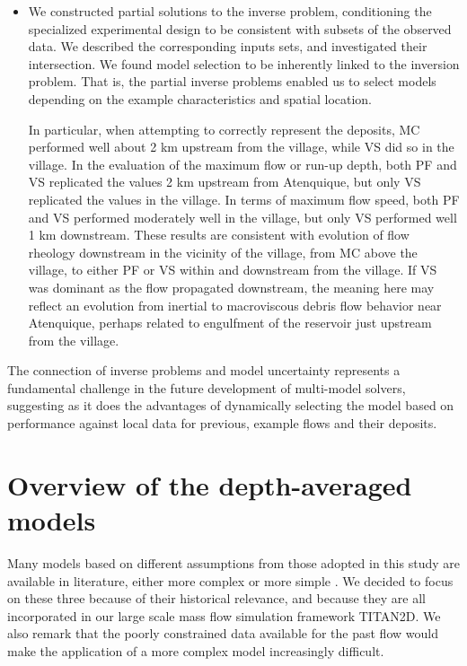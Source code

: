 \documentclass[nhess, manuscript]{copernicus}
\begin{document}
\begin{itemize}
  \item We constructed partial solutions to the inverse problem, conditioning the specialized experimental design to be consistent with subsets of the observed data. We  described the corresponding inputs sets, and investigated their intersection. We found model selection to be inherently linked to the inversion problem. That is, the partial inverse problems enabled us to select models depending on the example characteristics and spatial location.

      In particular, when attempting to correctly represent the deposits, MC performed well about 2 km upstream from the village, while VS did so in the village. In the evaluation of the maximum flow or run-up depth, both PF and VS replicated the values 2 km upstream from Atenquique, but only VS replicated the values in the village. In terms of maximum flow speed, both PF and VS performed moderately well in the village, but only VS performed well 1 km downstream.  These results are consistent with evolution of flow rheology downstream in the vicinity of the village, from MC above the village, to either PF or VS within and downstream from the village.  If VS was dominant as the flow propagated downstream, the meaning here may reflect an evolution from inertial to macroviscous debris flow behavior near Atenquique, perhaps related to engulfment of the reservoir just upstream from the village.
\end{itemize}
The connection of inverse problems and model uncertainty represents a fundamental challenge in the future development of multi-model solvers, suggesting as it does the advantages of dynamically selecting the model based on performance against local data for previous, example flows and their deposits.


\appendix
\section{Overview of the depth-averaged models}\label{A-1}
Many models based on different assumptions from those adopted in this study are available in literature, either more complex \citep{PitmanLe2005,Iverson2014} or more simple \citep{DadeHuppert1998,Kelfoun2009}. We decided to focus on these three because of their historical relevance, and because they are all incorporated in our large scale mass flow simulation framework TITAN2D. We also remark that the poorly constrained data available for the past flow would make the application of a more complex model increasingly difficult.
\end{document}
